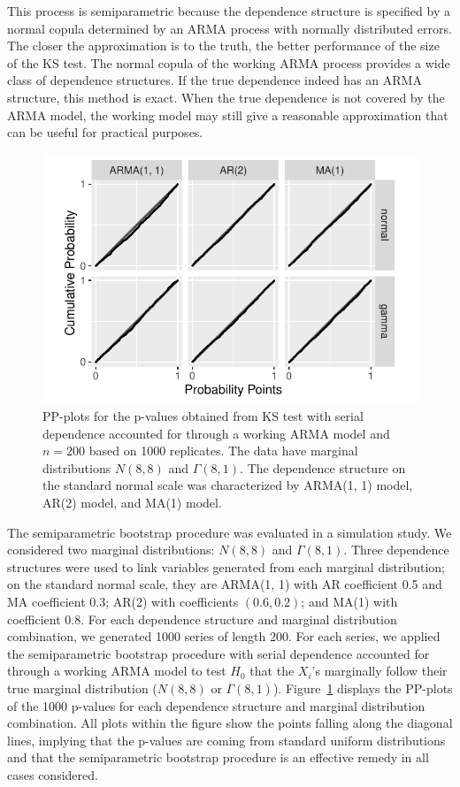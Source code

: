 \documentclass[12pt, letterpaper, titlepage]{article}
\begin{document}
This process is semiparametric because the dependence structure is specified by
a normal copula determined by an ARMA process with normally distributed errors.
The closer the approximation is to the truth, the better
performance of the size of the KS test. The normal copula of the working ARMA
process provides a wide class of dependence structures.
If the true dependence indeed has an ARMA structure, this method is exact. When
the true dependence is not covered by the ARMA model, the working model may 
still give a reasonable approximation that can
be useful for practical purposes. 

		
\begin{figure}[tbp]
  \centering
  \includegraphics[width=.75\textwidth]{pp_ss.pdf}
  \caption{PP-plots for the p-values obtained from KS test with serial
    dependence accounted for through a working ARMA model and $n = 200$ based on
    1000 replicates. The data have marginal distributions $N(8, 8)$ and
    $\Gamma(8, 1)$. The dependence structure on the standard normal scale was
    characterized by ARMA(1, 1) model, AR(2) model, and MA(1) model.
  }
  \label{fig:pp_ss}
\end{figure}


The semiparametric bootstrap procedure was evaluated in a simulation study. We
considered two marginal distributions: $N(8,8)$ and $\Gamma(8,1)$. Three
dependence structures were used to link variables generated from each marginal
distribution; on the standard normal scale, they are
ARMA(1, 1) with AR coefficient 0.5 and MA coefficient 0.3;
AR(2) with coefficients $(0.6, 0.2)$; and
MA(1) with coefficient 0.8.
For each dependence structure and marginal distribution combination, we
generated 1000 series of length 200.  For each series, we applied the
semiparametric bootstrap procedure with serial
dependence accounted for through a working ARMA model to test $H_0$ that the 
$X_i$'s marginally follow their true marginal distribution ($N(8, 8)$ or 
$\Gamma(8,1)$). Figure~\ref{fig:pp_ss} displays the PP-plots of the 1000 
p-values for each dependence structure and marginal distribution combination.
All plots within the figure show the points falling along the diagonal lines, 
implying that the p-values are coming from standard uniform distributions and 
that the semiparametric bootstrap procedure is an effective remedy in all cases
considered.
\end{document}

